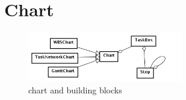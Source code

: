\section{Chart}
\label{sec:chart}

\begin{figure}[h!] 
	\centering
	\includegraphics[width=0.6\textwidth]{../ChartDetail.png}
	\caption{chart and building blocks}
	\label{fig:chart} 
\end{figure}